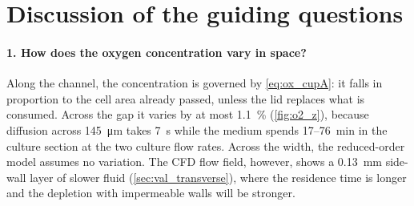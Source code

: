 \begin{table}[htbp]
\centering
\caption{Oxygen at the cell layer, $\Cbot/\Csat$, from the 1.5-D model with baseline parameters \tagM. Window = $5\le x\le\SI{40}{mm}$; ``hypoxic'' = area fraction of the window with $\Cbot<0.1\,\Csat$.}
\label{tab:o2_results}
\small
{}
\end{table}

\section{Discussion of the guiding questions}

\paragraph{1. How does the oxygen concentration vary in space?} Along the channel, the concentration is governed by \cref{eq:ox_cupA}: it falls in proportion to the cell area already passed, unless the lid replaces what is consumed. Across the gap it varies by at most \SI{1.1}{\percent} (\cref{fig:o2_z}), because diffusion across \SI{145}{\micro\metre} takes \SI{7}{s} while the medium spends 17--\SI{76}{min} in the culture section at the two culture flow rates. Across the width, the reduced-order model assumes no variation. The CFD flow field, however, shows a \SI{0.13}{mm} side-wall layer of slower fluid (\cref{sec:val_transverse}), where the residence time is longer and the depletion with impermeable walls will be stronger.

